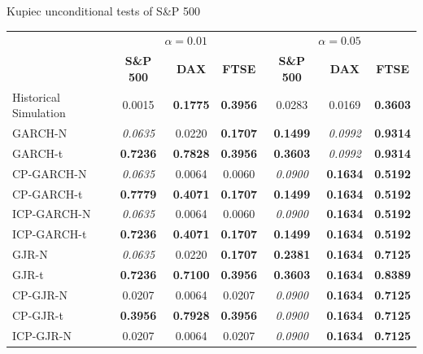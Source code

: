 \documentclass[preprint,12pt,authoryear]{elsarticle}
\begin{document}
\begin{center}
\begin{threeparttable}
\centering \footnotesize
\caption{\footnotesize Kupiec unconditional tests of S\&P 500}\label{tab7_3}
\begin{tabular}{l c c c c c c}
\toprule
 & \multicolumn{3}{c}{\textbf{$\alpha=0.01$}} & \multicolumn{3}{c}{\textbf{$\alpha=0.05$}}\\
 \cmidrule(r){2-4} \cmidrule(r){5-7}
 & \textbf{S\&P 500} & \textbf{DAX} & \textbf{FTSE} & \textbf{S\&P 500} & \textbf{DAX} & \textbf{FTSE}\\
\cmidrule{2-7}
Historical Simulation & 0.0015          & \textbf{0.1775} & \textbf{0.3956} & 0.0283          & 0.0169 & \textbf{0.3603} \\
GARCH-N               & \textit{0.0635} & 0.0220          & \textbf{0.1707} & \textbf{0.1499} & \textit{0.0992} & \textbf{0.9314} \\
GARCH-t               & \textbf{0.7236} & \textbf{0.7828} & \textbf{0.3956} & \textbf{0.3603} & \textit{0.0992} & \textbf{0.9314} \\
CP-GARCH-N            & \textit{0.0635} & 0.0064          & 0.0060 & \textit{0.0900} & \textbf{0.1634} & \textbf{0.5192} \\
CP-GARCH-t            & \textbf{0.7779} & \textbf{0.4071} & \textbf{0.1707} & \textbf{0.1499} & \textbf{0.1634} & \textbf{0.5192} \\
ICP-GARCH-N           & \textit{0.0635} & 0.0064          & 0.0060 & \textit{0.0900} & \textbf{0.1634} & \textbf{0.5192} \\
ICP-GARCH-t           & \textbf{0.7236} & \textbf{0.4071} & \textbf{0.1707} & \textbf{0.1499} & \textbf{0.1634} & \textbf{0.5192} \\
GJR-N                 & \textit{0.0635} & 0.0220          & \textbf{0.1707} & \textbf{0.2381} & \textbf{0.1634} & \textbf{0.7125} \\
GJR-t                 & \textbf{0.7236} & \textbf{0.7100} & \textbf{0.3956} & \textbf{0.3603} & \textbf{0.1634} & \textbf{0.8389} \\
CP-GJR-N              & 0.0207          & 0.0064          & 0.0207 & \textit{0.0900} & \textbf{0.1634} & \textbf{0.7125} \\
CP-GJR-t              & \textbf{0.3956} & \textbf{0.7928} & \textbf{0.3956} & \textit{0.0900} & \textbf{0.1634} & \textbf{0.7125} \\
ICP-GJR-N             & 0.0207          & 0.0064          & 0.0207 & \textit{0.0900} & \textbf{0.1634} & \textbf{0.7125} \\

\end{tabular}
\end{threeparttable}
\end{center}
\end{document}
